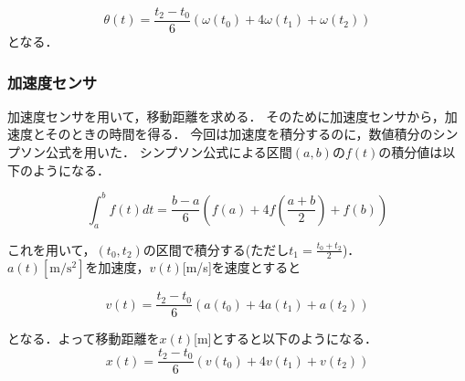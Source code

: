 \documentclass[11pt,a4]{jsarticle}
\begin{document}
\begin{equation}
 \theta(t)=\frac{t_2-t_0}{6}(\omega(t_0)+4\omega(t_1)+\omega(t_2) )
\end{equation}
となる．

\subsubsection{加速度センサ}
加速度センサを用いて，移動距離を求める．
そのために加速度センサから，加速度とそのときの時間を得る．
今回は加速度を積分するのに，数値積分のシンプソン公式を用いた．
シンプソン公式による区間$(a,b)$の$f(t)$の積分値は以下のようになる．


\begin{equation}
 \int_a^b f(t) dt = \frac{b-a}{6} ( f(a)+4f ( \frac{a+b}{2}) +f(b))
\end{equation}

これを用いて，$(t_0,t_2)$の区間で積分する(ただし$t_1=\frac{t_0+t_2}{2}$)．\\
$a(t)[\mathrm{m}/\mathrm{s}^{2}]$を加速度，$v(t)$[m/s]を速度とすると

\begin{equation}
 v(t)= \frac{t_2-t_0}{6} ( a(t_0)+4a(t_1)+a(t_2) )
\end{equation}

となる．よって移動距離を$x(t)$[m]とすると以下のようになる．
\begin{equation}
 x(t)= \frac{t_2-t_0}{6}(v(t_0)+4v(t_1)+v(t_2))
\end{equation}
\end{document}
